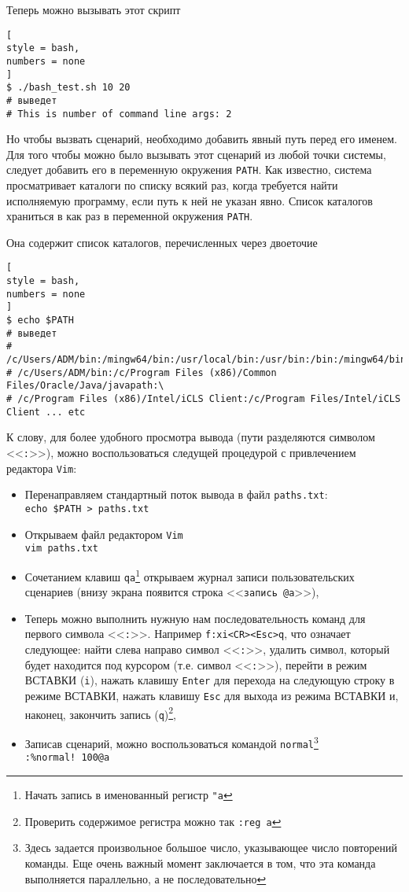 \documentclass[%
	11pt,
	a4paper,
	utf8,
		]{article}
\begin{document}
Теперь можно вызывать этот скрипт
\begin{lstlisting}[
style = bash,
numbers = none
]
$ ./bash_test.sh 10 20
# выведет
# This is number of command line args: 2
\end{lstlisting}

Но чтобы вызвать сценарий, необходимо добавить явный путь перед его именем. Для того чтобы можно было вызывать этот сценарий из любой точки системы, следует добавить его в переменную окружения \texttt{PATH}. Как известно, система просматривает каталоги по списку всякий раз, когда требуется найти исполняемую программу, если путь к ней не указан явно. Список каталогов храниться в как раз в переменной окружения \texttt{PATH}.

Она содержит список каталогов, перечисленных через двоеточие
\begin{lstlisting}[
style = bash,
numbers = none
]
$ echo $PATH
# выведет
# /c/Users/ADM/bin:/mingw64/bin:/usr/local/bin:/usr/bin:/bin:/mingw64/bin:/usr/bin:\
# /c/Users/ADM/bin:/c/Program Files (x86)/Common Files/Oracle/Java/javapath:\
# /c/Program Files (x86)/Intel/iCLS Client:/c/Program Files/Intel/iCLS Client ... etc
\end{lstlisting}

К слову, для более удобного просмотра вывода (пути разделяются символом <<\texttt{:}>>), можно воспользоваться следущей процедурой с привлечением редактора \texttt{Vim}:
\begin{itemize}
	\item Перенаправляем стандартный поток вывода в файл \texttt{paths.txt}: \\\verb|echo $PATH > paths.txt|
	
	\item Открываем файл редактором \texttt{Vim}\\\verb|vim paths.txt|
	
	\item Сочетанием клавиш \texttt{qa}\footnote{Начать запись в именованный регистр \texttt{"a}} открываем журнал записи пользовательских сценариев (внизу экрана появится строка <<\verb|запись @a|>>),
	
	\item Теперь можно выполнить нужную нам последовательность команд для первого символа <<\texttt{:}>>. Например \verb|f:xi<CR><Esc>q|, что означает следующее: найти слева направо символ <<\texttt{:}>>, удалить символ, который будет находится под курсором (т.е. символ <<\texttt{:}>>), перейти в режим ВСТАВКИ (\texttt{i}), нажать клавишу \texttt{Enter} для перехода на следующую строку в режиме ВСТАВКИ, нажать клавишу \texttt{Esc} для выхода из режима ВСТАВКИ и, наконец, закончить запись (\texttt{q})\footnote{Проверить содержимое регистра можно так \texttt{:reg a}},
	
	\item Записав сценарий, можно воспользоваться командой \texttt{normal}\footnote{Здесь задается произвольное большое число, указывающее число повторений команды. Еще очень важный момент заключается в том, что эта команда выполняется параллельно, а не последовательно} \\\verb|:%normal! 100@a|
\end{itemize}
\end{document}
